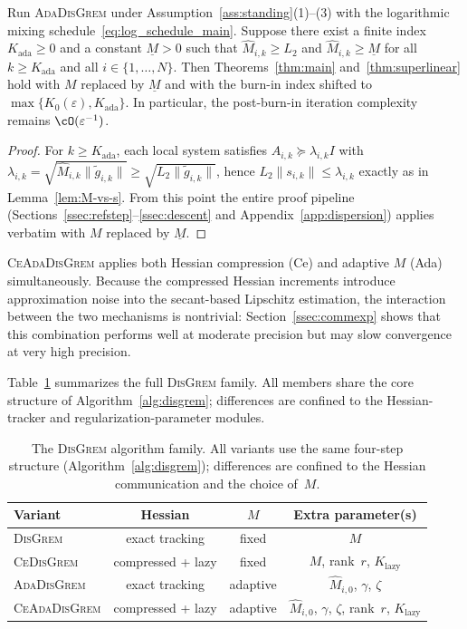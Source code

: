 \documentclass[review,onefignum,onetabnum]{siamart171218}
\begin{document}
	\begin{proposition}\label{prop:ada_cond}
	Run \textsc{AdaDisGrem} under Assumption~\ref{ass:standing}(1)--(3)
	with the logarithmic mixing schedule~\eqref{eq:log_schedule_main}.
	Suppose there exist a finite index $K_{\mathrm{ada}}\ge 0$ and a
	constant $\underline M>0$ such that
	$\hat M_{i,k}\ge L_2$ and $\hat M_{i,k}\ge \underline M$ for all
	$k\ge K_{\mathrm{ada}}$ and all $i\in\{1,\dots,N\}$.
	Then Theorems~\ref{thm:main} and~\ref{thm:superlinear} hold with
	$M$ replaced by $\underline M$ and with the burn-in index shifted
	to $\max\{K_0(\varepsilon),K_{\mathrm{ada}}\}$.
	In particular, the post-burn-in iteration complexity remains
	$\cO(\varepsilon^{-1})$.
	\end{proposition}
	\begin{proof}
	For $k\ge K_{\mathrm{ada}}$, each local system satisfies
	$A_{i,k}\succeq \lambda_{i,k}I$ with
	$\lambda_{i,k}=\sqrt{\hat M_{i,k}\|\tilde g_{i,k}\|}
	\ge \sqrt{L_2\|\tilde g_{i,k}\|}$,
	hence $L_2\|s_{i,k}\|\le \lambda_{i,k}$ exactly as in
	Lemma~\ref{lem:M-vs-s}.
	From this point the entire proof pipeline
	(Sections~\ref{ssec:refstep}--\ref{ssec:descent} and
	Appendix~\ref{app:dispersion}) applies verbatim with $M$
	replaced by $\underline M$.
	\end{proof}
	
	\textsc{CeAdaDisGrem} applies both Hessian compression (Ce) and
	adaptive $M$ (Ada) simultaneously.
	Because the compressed Hessian increments introduce approximation noise
	into the secant-based Lipschitz estimation, the interaction between
	the two mechanisms is nontrivial: Section~\ref{ssec:commexp} shows
	that this combination performs well at moderate precision but may slow
	convergence at very high precision.

	Table~\ref{tab:family} summarizes the full \textsc{DisGrem} family.
	All members share the core structure of Algorithm~\ref{alg:disgrem};
	differences are confined to the Hessian-tracker and
	regularization-parameter modules.

	\begin{table}[htbp]
		\centering
		\caption{The \textsc{DisGrem} algorithm family.
			All variants use the same four-step structure (Algorithm~\ref{alg:disgrem});
			differences are confined to the Hessian communication and the choice of~$M$.}
		\label{tab:family}
		\setlength{\tabcolsep}{4pt}
		\small
		\begin{tabular}{lccc}
			\toprule
			Variant & Hessian & $M$ & Extra parameter(s) \\
			\midrule
			\textsc{DisGrem}       & exact tracking       & fixed  & $M$ \\
			\textsc{CeDisGrem}     & compressed + lazy     & fixed  & $M$, rank~$r$, $K_{\mathrm{lazy}}$ \\
			\textsc{AdaDisGrem}    & exact tracking       & adaptive & $\hat M_{i,0}$, $\gamma$, $\zeta$ \\
			\textsc{CeAdaDisGrem}  & compressed + lazy     & adaptive & $\hat M_{i,0}$, $\gamma$, $\zeta$, rank~$r$, $K_{\mathrm{lazy}}$ \\
			\bottomrule
		\end{tabular}
	\end{table}
	
\end{document}
